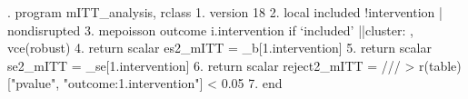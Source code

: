 . program mITT_analysis, rclass
  1.   version 18
  2.   local included !intervention | nondisrupted
  3.   mepoisson outcome i.intervention if `included' ||cluster: , vce(robust)
  4.   return scalar es2_mITT      = _b[1.intervention]
  5.   return scalar se2_mITT      = _se[1.intervention]
  6.   return scalar reject2_mITT  =                                        ///
>                     r(table)["pvalue", "outcome:1.intervention"] < 0.05
  7. end
{\smallskip}
